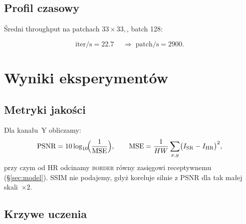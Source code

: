 \documentclass[11pt]{article}
\begin{document}
\subsection{Profil czasowy}

Średni throughput na patchach
$33 \times 33, $, batch 128:

\[
\text{iter/s}=\num{22.7}\;\quad\Rightarrow\;
\text{patch/s}=\num{2900}.
\]



\section{Wyniki eksperymentów}
\label{sec:results}

\subsection{Metryki jakości}

Dla kanału~Y obliczamy:
\[
  \text{PSNR} = 10 \log_{10}\!
  \Bigl(\frac{1}{\text{MSE}}\Bigr),\qquad
  \text{MSE}=\frac1{HW}\sum_{x,y}
  \bigl(I_\mathrm{SR}-I_\mathrm{HR}\bigr)^{2},
\]
przy czym od HR odcinamy \textsc{border} równy zasięgowi receptywnemu
(\S\ref{sec:model}).  SSIM nie podajemy, gdyż koreluje silnie z PSNR
dla tak małej skali~$\times2$.

\subsection{Krzywe uczenia}
\end{document}
